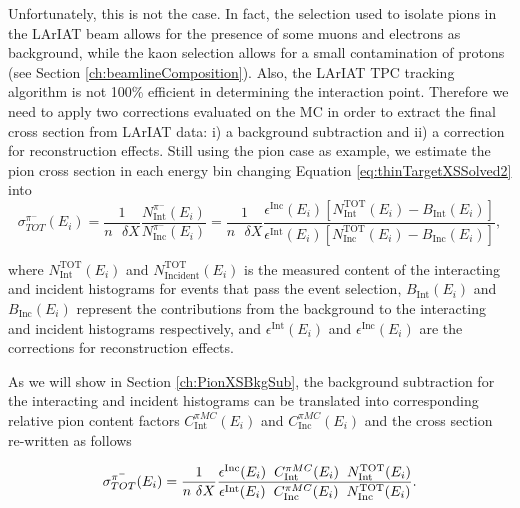 Unfortunately, this is not the case. In fact, the selection used to isolate pions in the LArIAT beam allows for the presence of some muons and electrons as background, while the kaon selection allows for a small contamination of protons (see Section \ref{ch:beamlineComposition}). Also, the LArIAT TPC tracking algorithm is not 100\% efficient in determining the interaction point. Therefore we need to apply two corrections evaluated on the MC in order to extract the final cross section from LArIAT data: i) a background subtraction and ii) a correction for reconstruction effects. 
Still using the pion case as example, we estimate the pion cross section in each energy bin changing  Equation \ref{eq:thinTargetXSSolved2} into
\begin{equation}
 \sigma^{\pi^-}_{TOT}(E_{i})  =\frac{1}{n\text{ } \delta X}\frac{N^{\pi^-}_{ \text{Int}} (E_{i})}{N^{\pi^-}_{ \text{Inc}}(E_{i})} = \frac{1}{n \text{ }\delta X}\frac{ \epsilon^{\text{Inc}}(E_i) [ N^{ \text{TOT}}_{ \text{Int}} (E_{i}) - B_{ \text{Int}} (E_i)] }{   \epsilon^{\text{Int}}(E_i) [N^{ \text{TOT}}_{ \text{Inc}}(E_{i}) - B_{ \text{Inc}} (E_i)]},
\label{eq:True}
\end{equation}



 
where  $N^{\text{TOT}}_{\text{Int}} (E_{i})$ and $N^{\text{TOT}}_{\text{Incident}} (E_{i})$ is the measured content of the interacting and incident histograms for events that pass the event selection, $B_{\text{Int}} (E_i)$ and $B_{\text{Inc}} (E_i)$ represent the contributions from the background to the interacting and incident histograms respectively, and  $\epsilon^{\text{Int}}(E_i)$ and  $\epsilon^{\text{Inc}}(E_i)$ are the corrections for reconstruction effects.

As we will show in Section \ref{ch:PionXSBkgSub}, the background subtraction for the interacting and incident histograms can be translated into corresponding relative pion content factors $C^{\pi MC}_{\text{Int}} (E_{i})$ and $C^{\pi MC}_{\text{Inc}} (E_{i})$ and the cross section re-written as follows

\begin{equation}
      \sigma^{\pi^-}_{TOT}(E_{i})  = \frac{1}{n\text{ } \delta X}\frac{ \epsilon^{\text{Inc}}(E_i)  \hspace{0.2cm} C^{\pi MC}_{\text{Int}} (E_{i}) \hspace{0.2cm} N^{\text{TOT}}_{\text{Int}} (E_{i}) }{   \epsilon^{\text{Int}}(E_i) \hspace{0.2cm} C^{\pi MC}_{\text{Inc}} (E_{i}) \hspace{0.2cm}  N^{\text{TOT}}_{\text{Inc}} (E_{i})}.
\label{eq:C}
\end{equation}



